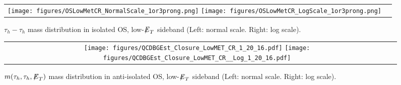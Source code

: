 \begin{table}[!htpb]
   \caption{ Yields in the controls region 1(B) and 1(D) used for calculation of OS/LS ratio.}
   \label{table:OLSStable} %
 \end{table}
  
\begin{figure}[tbhp!]
      \centering
      \begin{tabular}{cc}
        \texttt{[image: figures/OSLowMetCR\_NormalScale\_1or3prong.png]}
        \texttt{[image: figures/OSLowMetCR\_LogScale\_1or3prong.png]}
      \end{tabular}
     \caption{$\tau_{h} - \tau_{h}$ mass distribution in isolated OS, low-${\not\mathrel{E}}_T$ sideband (Left: normal scale.  Right: log scale).}
    \label{fig:MG304}
 \end{figure}

\begin{figure}[tbhp!]
      \centering
      \begin{tabular}{cc}
        \texttt{[image: figures/QCDBGEst\_Closure\_LowMET\_CR\_1\_20\_16.pdf]}
        \texttt{[image: figures/QCDBGEst\_Closure\_LowMET\_CR\_\_Log\_1\_20\_16.pdf]}
      \end{tabular}
     \caption{$m(\tau_{h},\tau_{h},{\not\mathrel{E}}_T)$ mass distribution in anti-isolated OS, low-${\not\mathrel{E}}_T$ sideband (Left: normal scale.  Right: log scale).}
    \label{fig:MG305}
 \end{figure}


